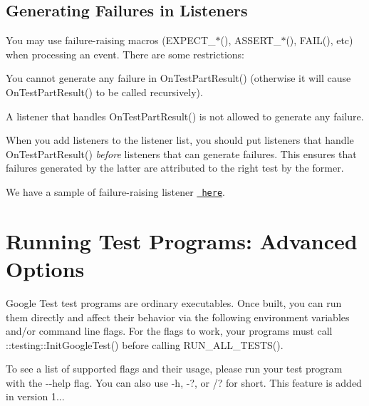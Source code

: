 \subsection*{Generating Failures in Listeners}

You may use failure-\/raising macros ({\ttfamily E\+X\+P\+E\+C\+T\+\_\+$\ast$()}, {\ttfamily A\+S\+S\+E\+R\+T\+\_\+$\ast$()}, {\ttfamily F\+A\+I\+L()}, etc) when processing an event. There are some restrictions\+:


\begin{DoxyEnumerate}
\item You cannot generate any failure in {\ttfamily On\+Test\+Part\+Result()} (otherwise it will cause {\ttfamily On\+Test\+Part\+Result()} to be called recursively).
\end{DoxyEnumerate}
\begin{DoxyEnumerate}
\item A listener that handles {\ttfamily On\+Test\+Part\+Result()} is not allowed to generate any failure.
\end{DoxyEnumerate}

When you add listeners to the listener list, you should put listeners that handle {\ttfamily On\+Test\+Part\+Result()} {\itshape before} listeners that can generate failures. This ensures that failures generated by the latter are attributed to the right test by the former.

We have a sample of failure-\/raising listener \href{../samples/sample10_unittest.cc}\texttt{ here}.

\section*{Running Test Programs\+: Advanced Options}

Google Test test programs are ordinary executables. Once built, you can run them directly and affect their behavior via the following environment variables and/or command line flags. For the flags to work, your programs must call {\ttfamily \+::testing\+::\+Init\+Google\+Test()} before calling {\ttfamily R\+U\+N\+\_\+\+A\+L\+L\+\_\+\+T\+E\+S\+T\+S()}.

To see a list of supported flags and their usage, please run your test program with the {\ttfamily -\/-\/help} flag. You can also use {\ttfamily -\/h}, {\ttfamily -\/?}, or {\ttfamily /?} for short. This feature is added in version 1...

